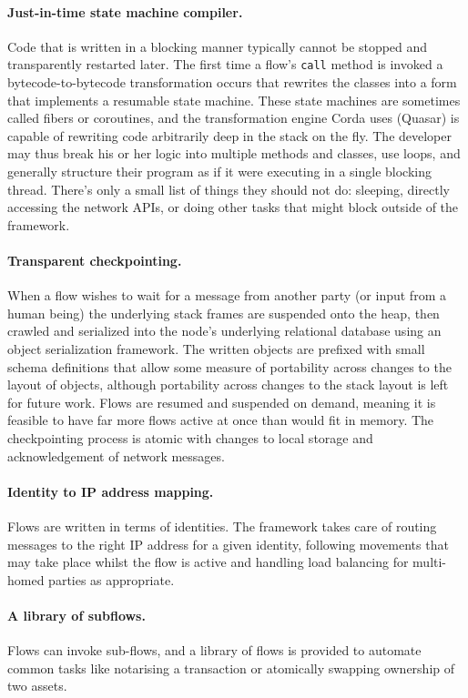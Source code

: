 \documentclass{article}
\begin{document}
\paragraph{Just-in-time state machine compiler.}Code that is written in a blocking manner typically cannot be stopped
and transparently restarted later. The first time a flow's \texttt{call} method is invoked a bytecode-to-bytecode
transformation occurs that rewrites the classes into a form that implements a resumable state machine. These state
machines are sometimes called fibers or coroutines, and the transformation engine Corda uses (Quasar) is capable of rewriting
code arbitrarily deep in the stack on the fly. The developer may thus break his or her logic into multiple methods and
classes, use loops, and generally structure their program as if it were executing in a single blocking thread. There's only a
small list of things they should not do: sleeping, directly accessing the network APIs, or doing other tasks that might
block outside of the framework.

\paragraph{Transparent checkpointing.}When a flow wishes to wait for a message from another party (or input from a
human being) the underlying stack frames are suspended onto the heap, then crawled and serialized into the node's
underlying relational database using an object serialization framework. The written objects are prefixed with small
schema definitions that allow some measure of portability across changes to the layout of objects, although
portability across changes to the stack layout is left for future work. Flows are resumed and suspended on demand, meaning
it is feasible to have far more flows active at once than would fit in memory. The checkpointing process is atomic with
changes to local storage and acknowledgement of network messages.

\paragraph{Identity to IP address mapping.}Flows are written in terms of identities. The framework takes care of routing
messages to the right IP address for a given identity, following movements that may take place whilst the flow is active
and handling load balancing for multi-homed parties as appropriate.

\paragraph{A library of subflows.}Flows can invoke sub-flows, and a library of flows is provided to automate common tasks
like notarising a transaction or atomically swapping ownership of two assets.
\end{document}
